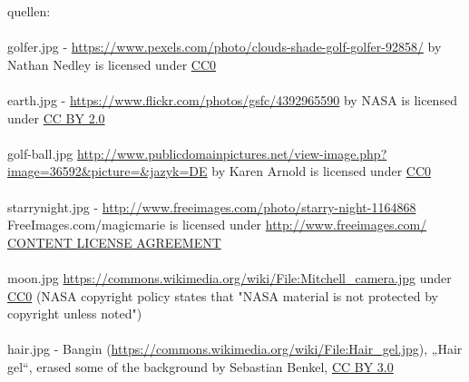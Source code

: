 \documentclass{article}
\begin{document}
quellen:
\\
\\
golfer.jpg - \url{https://www.pexels.com/photo/clouds-shade-golf-golfer-92858/} by Nathan Nedley is licensed under \hyperlink{https://creativecommons.org/publicdomain/zero/1.0/deed.de}{CC0}
\\
\\
earth.jpg - \url{https://www.flickr.com/photos/gsfc/4392965590} by NASA is licensed under \hyperlink{https://creativecommons.org/licenses/by/2.0/}{CC BY 2.0}
\\
\\
golf-ball.jpg \url{http://www.publicdomainpictures.net/view-image.php?image=36592&picture=&jazyk=DE} by Karen Arnold is licensed under \hyperlink{https://creativecommons.org/publicdomain/zero/1.0/deed.de}{CC0}
\\
\\
starrynight.jpg - \url{http://www.freeimages.com/photo/starry-night-1164868} FreeImages.com/magicmarie  is licensed under \hyperlink{http://www.freeimages.com/license}{http://www.freeimages.com/ CONTENT LICENSE AGREEMENT}
\\
\\
moon.jpg \url{https://commons.wikimedia.org/wiki/File:Mitchell_camera.jpg} under \hyperlink{https://creativecommons.org/publicdomain/zero/1.0/deed.de}{CC0} (NASA copyright policy states that "NASA material is not protected by copyright unless noted")
\\
\\
hair.jpg - Bangin (\url{https://commons.wikimedia.org/wiki/File:Hair_gel.jpg}), „Hair gel“, erased some of the background by Sebastian Benkel, \hyperlink{https://creativecommons.org/licenses/by/3.0/deed.de}{CC BY 3.0}
\end{document}
